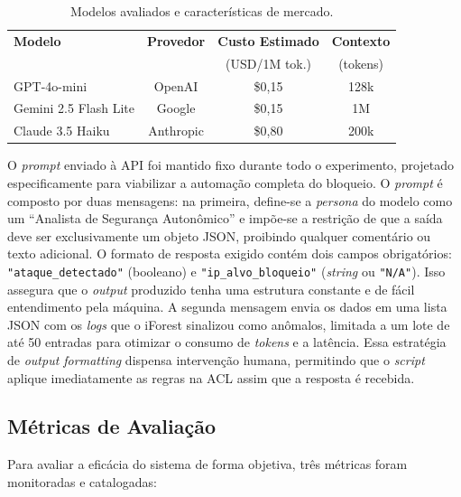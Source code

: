 \documentclass[sigconf, anonymous]{acmart}
\begin{document}
\begin{table}[htbp]
\caption{Modelos avaliados e características de mercado.}
\label{tab:modelos}
\centering
\begin{tabular}{lccc}
\toprule
\textbf{Modelo} & \textbf{Provedor} & \textbf{Custo Estimado} & \textbf{Contexto} \\
                &                  & (USD/1M tok.)           & (tokens)          \\
\midrule
GPT-4o-mini          & OpenAI    & \$0,15 & 128k \\
Gemini 2.5 Flash Lite & Google   & \$0,15 & 1M   \\
Claude 3.5 Haiku     & Anthropic & \$0,80 & 200k \\
\bottomrule
\end{tabular}
\end{table}

O \textit{prompt} enviado à \ac{API} foi mantido fixo durante todo o experimento, projetado especificamente para viabilizar a automação completa do bloqueio. O \textit{prompt} é composto por duas mensagens: na primeira, define-se a \textit{persona} do modelo como um ``Analista de Segurança Autonômico'' e impõe-se a restrição de que a saída deve ser exclusivamente um objeto \ac{JSON}, proibindo qualquer comentário ou texto adicional. O formato de resposta exigido contém dois campos obrigatórios: \texttt{"ataque\_detectado"} (booleano) e \texttt{"ip\_alvo\_bloqueio"} (\textit{string} ou \texttt{"N/A"}). Isso assegura que o \textit{output} produzido tenha uma estrutura constante e de fácil entendimento pela máquina. A segunda mensagem envia os dados em uma lista \ac{JSON} com os \textit{logs} que o \ac{iForest} sinalizou como anômalos, limitada a um lote de até 50 entradas para otimizar o consumo de \textit{tokens} e a latência. Essa estratégia de \textit{output formatting} dispensa intervenção humana, permitindo que o \textit{script} aplique imediatamente as regras na \ac{ACL} assim que a resposta é recebida.

\subsection{Métricas de Avaliação}
\label{sec:aval_metrics}

Para avaliar a eficácia do sistema de forma objetiva, três métricas foram monitoradas e catalogadas:
\end{document}
